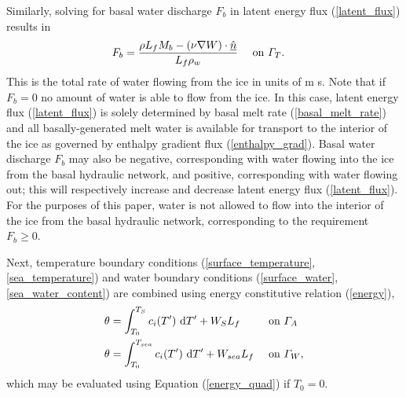 Similarly, solving for basal water discharge $F_b$ in latent energy flux (\ref{latent_flux}) results in
\begin{align}
  \label{basal_water_discharge}
  F_b &= \frac{\rho L_f M_b - \left( \nu \nabla W \right) \cdot \underline{\hat{n}}}{L_f \rho_w} &&\text{ on } \varGamma_T.
\end{align}
This is the total rate of water flowing from the ice in units of m s.  Note that if $F_b = 0$ no amount of water is able to flow from the ice.  In this case, latent energy flux (\ref{latent_flux}) is solely determined by basal melt rate (\ref{basal_melt_rate}) and all basally-generated melt water is available for transport to the interior of the ice as governed by enthalpy gradient flux (\ref{enthalpy_grad}).  Basal water discharge $F_b$ may also be negative, corresponding with water flowing into the ice from the basal hydraulic network, and positive, corresponding with water flowing out; this will respectively increase and decrease latent energy flux (\ref{latent_flux}).  For the purposes of this paper, water is not allowed to flow into the interior of the ice from the basal hydraulic network, corresponding to the requirement $F_b \geq 0$.

Next, temperature boundary conditions (\ref{surface_temperature}, \ref{sea_temperature}) and water boundary conditions (\ref{surface_water}, \ref{sea_water_content}) are combined using energy constitutive relation (\ref{energy}),
\begin{align}
  \label{gamma_a_ebc}
  \theta &= \int_{T_0}^{T_S} c_i(T') \ \mathrm{d}T' + W_S L_f &&\text{ on } \varGamma_A \\
  \label{gamma_w_ebc}
  \theta &= \int_{T_0}^{T_{sea}} c_i(T') \ \mathrm{d}T' + W_{sea} L_f &&\text{ on } \varGamma_W,
\end{align}
which may be evaluated using Equation (\ref{energy_quad}) if $T_0 = 0$.

